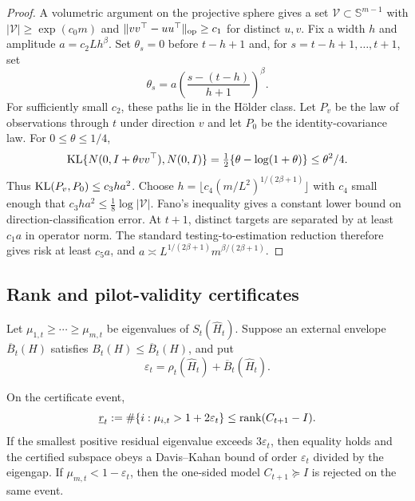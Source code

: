 \begin{proof}
A volumetric argument on the projective sphere gives a set $\mathcal V\subset\mathbb S^{m-1}$ with $|\mathcal V|\ge\exp(c_0m)$ and
$\|vv^\top-uu^\top\|_{\mathrm{op}}\ge c_1$ for distinct $u,v$.  Fix a width $h$ and amplitude $a=c_2Lh^\beta$.  Set $\theta_s=0$ before $t-h+1$ and, for $s=t-h+1,\ldots,t+1$, set
\begin{equation}
 \theta_s=a\left(\frac{s-(t-h)}{h+1}\right)^\beta.
\end{equation}
For sufficiently small $c_2$, these paths lie in the H\"older class.  Let $P_v$ be the law of observations through $t$ under direction $v$ and let $P_0$ be the identity-covariance law.  For $0\le\theta\le1/4$,
\begin{equation}
 \operatorname{KL}\{N(0,I+\theta vv^\top),N(0,I)\}
 =\tfrac12\{\theta-\log(1+\theta)\}\le\theta^2/4.
\end{equation}
Thus $\operatorname{KL}(P_v,P_0)\le c_3ha^2$.  Choose
$h=\lfloor c_4(m/L^2)^{1/(2\beta+1)}\rfloor$ with $c_4$ small enough that
$c_3ha^2\le\frac18\log|\mathcal V|$.  Fano's inequality gives a constant lower bound on direction-classification error.  At $t+1$, distinct targets are separated by at least $c_1a$ in operator norm.  The standard testing-to-estimation reduction therefore gives risk at least $c_5a$, and
$a\asymp L^{1/(2\beta+1)}m^{\beta/(2\beta+1)}$.  \end{proof}

\subsection{Rank and pilot-validity certificates}

Let $\mu_{1,t}\ge\cdots\ge\mu_{m,t}$ be eigenvalues of $S_t(\widehat H_t)$.  Suppose an external envelope $\overline B_t(H)$ satisfies
$B_t(H)\le\overline B_t(H)$, and put
\begin{equation}
 \varepsilon_t=\rho_t(\widehat H_t)+\overline B_t(\widehat H_t).
\end{equation}

\begin{proposition}
\label{prop:certificate-app}
On the certificate event,
\begin{equation}
 \underline r_t:=\#\{i:\mu_{i,t}>1+2\varepsilon_t\}
 \le\operatorname{rank}(C_{t+1}-I).
\end{equation}
If the smallest positive residual eigenvalue exceeds $3\varepsilon_t$, then equality holds and the certified subspace obeys a Davis--Kahan bound of order $\varepsilon_t$ divided by the eigengap.  If $\mu_{m,t}<1-\varepsilon_t$, then the one-sided model $C_{t+1}\succeq I$ is rejected on the same event.
\end{proposition}

